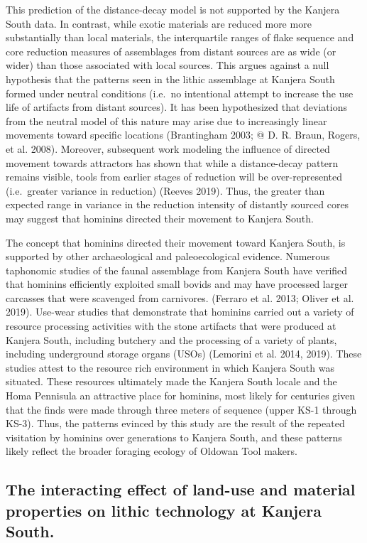 \documentclass[]{elsarticle} %
\begin{document}
This prediction of the distance-decay model is not supported by the
Kanjera South data. In contrast, while exotic materials are reduced more
more substantially than local materials, the interquartile ranges of
flake sequence and core reduction measures of assemblages from distant
sources are as wide (or wider) than those associated with local sources.
This argues against a null hypothesis that the patterns seen in the
lithic assemblage at Kanjera South formed under neutral conditions
(i.e.~no intentional attempt to increase the use life of artifacts from
distant sources). It has been hypothesized that deviations from the
neutral model of this nature may arise due to increasingly linear
movements toward specific locations (Brantingham 2003; @ D. R. Braun,
Rogers, et al. 2008). Moreover, subsequent work modeling the influence
of directed movement towards attractors has shown that while a
distance-decay pattern remains visible, tools from earlier stages of
reduction will be over-represented (i.e.~greater variance in reduction)
(Reeves 2019). Thus, the greater than expected range in variance in the
reduction intensity of distantly sourced cores may suggest that hominins
directed their movement to Kanjera South.

The concept that hominins directed their movement toward Kanjera South,
is supported by other archaeological and paleoecological evidence.
Numerous taphonomic studies of the faunal assemblage from Kanjera South
have verified that hominins efficiently exploited small bovids and may
have processed larger carcasses that were scavenged from carnivores.
(Ferraro et al. 2013; Oliver et al. 2019). Use-wear studies that
demonstrate that hominins carried out a variety of resource processing
activities with the stone artifacts that were produced at Kanjera South,
including butchery and the processing of a variety of plants, including
underground storage organs (USOs) (Lemorini et al. 2014, 2019). These
studies attest to the resource rich environment in which Kanjera South
was situated. These resources ultimately made the Kanjera South locale
and the Homa Pennisula an attractive place for hominins, most likely for
centuries given that the finds were made through three meters of
sequence (upper KS-1 through KS-3). Thus, the patterns evinced by this
study are the result of the repeated visitation by hominins over
generations to Kanjera South, and these patterns likely reflect the
broader foraging ecology of Oldowan Tool makers.

\hypertarget{the-interacting-effect-of-land-use-and-material-properties-on-lithic-technology-at-kanjera-south.}{%
\subsection{The interacting effect of land-use and material properties
on lithic technology at Kanjera
South.}\label{the-interacting-effect-of-land-use-and-material-properties-on-lithic-technology-at-kanjera-south.}}
\end{document}
